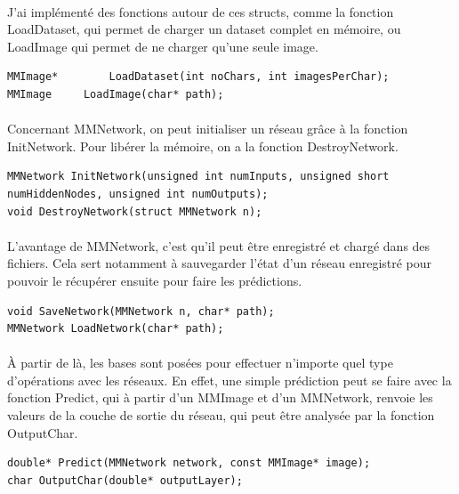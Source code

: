 \documentclass{article}
\begin{document}
\paragraph{}J'ai implémenté des fonctions autour de ces structs, comme la fonction LoadDataset, qui permet de charger un dataset complet en mémoire, ou LoadImage qui permet de ne charger qu'une seule image.

\begin{lstlisting}
MMImage*		LoadDataset(int noChars, int imagesPerChar);
MMImage		LoadImage(char* path);
\end{lstlisting}

\paragraph{}Concernant MMNetwork, on peut initialiser un réseau grâce à la fonction InitNetwork.
Pour libérer la mémoire, on a la fonction DestroyNetwork.

\begin{lstlisting}
MMNetwork InitNetwork(unsigned int numInputs, unsigned short numHiddenNodes, unsigned int numOutputs);
void DestroyNetwork(struct MMNetwork n);

\end{lstlisting}

\paragraph{}L'avantage de MMNetwork, c'est qu'il peut être enregistré et chargé dans des fichiers. Cela sert notamment à sauvegarder l'état d'un réseau enregistré pour pouvoir le récupérer ensuite pour faire les prédictions.

\begin{lstlisting}
void SaveNetwork(MMNetwork n, char* path);
MMNetwork LoadNetwork(char* path);
\end{lstlisting}


\paragraph{}
À partir de là, les bases sont posées pour effectuer n'importe quel type d'opérations avec les réseaux. En effet, une simple prédiction peut se faire avec la fonction Predict, qui à partir d'un MMImage et d'un MMNetwork, renvoie les valeurs de la couche de sortie du réseau, qui peut être analysée par la fonction OutputChar.

\begin{lstlisting}
double*	Predict(MMNetwork network, const MMImage* image);
char OutputChar(double* outputLayer);
\end{lstlisting}
\end{document}
